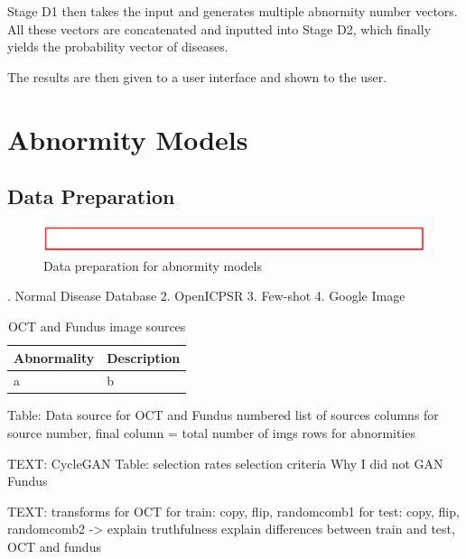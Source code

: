 \documentclass{article}
\begin{document}
		Stage D1 then takes the input and generates multiple abnormity number vectors. All these vectors are concatenated and inputted into Stage D2, which finally yields the probability vector of diseases.
		
		The results are then given to a user interface and shown to the user.
		
		
	\section{Abnormity Models}
	
		\subsection{Data Preparation}
			
			\begin{figure}[htbp]
				\centering
				\includegraphics[width=\linewidth]{Figs/Temp.png}
				\caption{Data preparation for abnormity models}
				\vspace{0.3cm}
				\label{fig:A_data_prep}
			\end{figure}
			
			{
				\fontsize{9}{12}. Normal Disease Database
				2. OpenICPSR
				3. Few-shot
				4. Google Image
				
				
				\begin{longtable}{lp{3.8in}}
					\caption{OCT and Fundus image sources}
					\label{tb:source}
					\toprule
					Abnormality&Description\\
					\midrule
					
					a & b\\
					
					\bottomrule
				\end{longtable}
			}
			
			Table: Data source for OCT and Fundus
				numbered list of sources
				columns for source number, final column = total number of imgs
				rows for abnormities
			
			TEXT: CycleGAN
				Table: selection rates
				selection criteria
				Why I did not GAN Fundus
				
			TEXT: transforms for OCT
				for train: copy, flip, randomcomb1
				for test: copy, flip, randomcomb2 -> explain truthfulness
				explain differences between train and test, OCT and fundus
\end{document}
